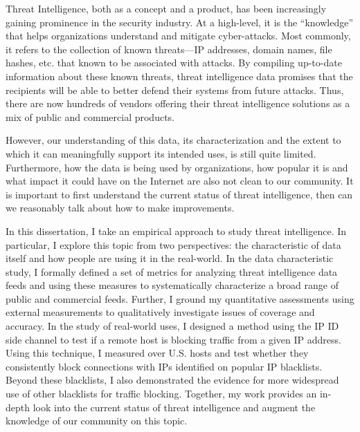 \begin{dissertationabstract}

Threat Intelligence, both as a concept and a product, has been increasingly
gaining prominence in the security industry. At a high-level, it is the 
``knowledge'' that helps organizations understand and mitigate cyber-attacks.
Most commonly, it refers to the collection of known threats---IP addresses, 
domain names, file hashes, etc. that known to be associated with attacks.
By compiling up-to-date information about these known threats, threat 
intelligence data promises that the recipients will be able to better 
defend their systems from future attacks. Thus, there are now hundreds of
vendors offering their threat intelligence solutions as a mix of public and
commercial products. 

However, our understanding of this data, its characterization and the
extent to which it can meaningfully support its intended uses, is
still quite limited. Furthermore, how the data is being used by
organizations, how popular it is and what impact it could have 
on the Internet are also not clean to our community. 
It is important to first understand the current status of threat 
intelligence, then can we reasonably talk about how to make improvements.

In this dissertation, I take an empirical approach to study threat 
intelligence. In particular, I explore this topic from two perspectives:
the characteristic of data itself and how people are using it in the real-world.
In the data characteristic study, I formally defined a set of metrics for 
analyzing threat intelligence data feeds and using these measures to 
systematically characterize a broad range of public and commercial feeds. 
Further, I ground my quantitative assessments using external measurements 
to qualitatively investigate issues of coverage and accuracy. In the study
of real-world uses, I designed a method using the IP ID side channel to test 
if a remote host is blocking traffic from a given IP address. Using this
technique, I measured over {} U.S. hosts and test whether they 
consistently block connections with IPs identified on popular IP blacklists. 
Beyond these blacklists, I also demonstrated the evidence for more widespread 
use of other blacklists for traffic blocking. Together, my work provides
an in-depth look into the current status of threat intelligence and augment
the knowledge of our community on this topic.

\end{dissertationabstract}
